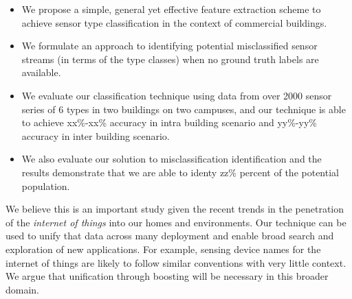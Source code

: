 \begin{itemize}
\item We propose a simple, general yet effective feature extraction scheme to achieve sensor type classification in the context of commercial buildings.
\item We formulate an approach to identifying potential misclassified sensor streams (in terms of the type classes) when no ground truth labels are available.
\item We evaluate our classification technique using data from over 2000 sensor series of 6 types in two buildings on two campuses, and our technique is able to achieve xx\%-xx\% accuracy in intra building scenario and yy\%-yy\% accuracy in inter building scenario.
\item We also evaluate our solution to misclassification identification and the results demonstrate that we are able to identy zz\% percent of the potential population.
\end{itemize}


We believe this is an important study given the recent trends in the penetration
of the \emph{internet of things} into our homes and environments.
Our technique can be used to unify that data across many deployment and enable broad search 
and exploration of new applications.  For example, sensing device names for 
the internet of things are likely to follow similar conventions with very little 
context.  We argue that unification through boosting will be necessary in this broader domain.




 






